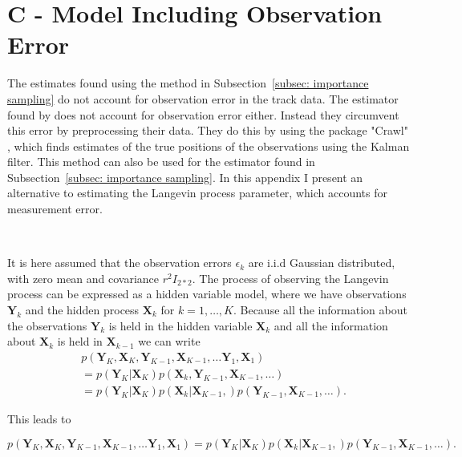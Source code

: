 
\chapter*{C - Model Including Observation Error}
\label{Appendix: Langevin with obs error}


The estimates found using the method in Subsection~\ref{subsec: importance sampling} do not account for observation error in the track data. The estimator found by \textcite{michelot_langevin_2019} does not account for observation error either. Instead they circumvent this error by preprocessing their data. They do this by using the package "Crawl" \parencite{johnson2018crawl}, which finds estimates of the true positions of the observations using the Kalman filter. This method can also be used for the estimator found in Subsection~\ref{subsec: importance sampling}. In this appendix I present an alternative to estimating the Langevin process parameter, which accounts for measurement error.

\

It is here assumed that the observation errors $\epsilon_k$ are i.i.d Gaussian distributed, with zero mean and covariance $r^2 I_{2*2}$. The process of observing the Langevin process can be expressed as a hidden variable model, where we have observations $\textbf{Y}_k$ and the hidden process $\textbf{X}_k$ for $k=1,\dots,K$. Because all the information about the observations $\textbf{Y}_k$ is held in the hidden variable $\textbf{X}_k$  and all the information about $\textbf{X}_k$ is held in $\textbf{X}_{k-1}$ we can write
$$
\begin{align}
&p(\textbf{Y}_{K}, \textbf{X}_{K}, \textbf{Y}_{K-1} ,\textbf{X}_{K-1} , \dots \textbf{Y}_1, \textbf{X}_1) \\ 
&= p(\textbf{Y}_{K}|\textbf{X}_{K})p(\textbf{X}_k, \textbf{Y}_{K-1},\textbf{X}_{K-1},\dots) \\ 
&=p(\textbf{Y}_{K}|\textbf{X}_{K})p(\textbf{X}_k | \textbf{X}_{K-1},)p(\textbf{Y}_{K-1},\textbf{X}_{K-1},\dots).
\end{align}
$$





This leads to

$$
p(\textbf{Y}_{K}, \textbf{X}_{K}, \textbf{Y}_{K-1} ,\textbf{X}_{K-1} , \dots \textbf{Y}_1, \textbf{X}_1) = p(\textbf{Y}_{K}|\textbf{X}_{K})p(\textbf{X}_k | \textbf{X}_{K-1},)p(\textbf{Y}_{K-1},\textbf{X}_{K-1},\dots).
$$


